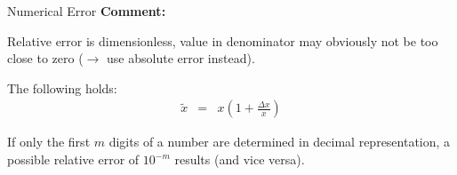 \begin{vbframe}{Numerical Error}
\textbf{Comment:}

Relative error is dimensionless, value in denominator
may obviously not be too close to zero ($\to$ use absolute error instead).


\framebreak

The following holds:
\begin{eqnarray*}
  \label{eq:1}
  \tilde x &=& x \left(1+\frac{\Delta x}{x}\right)
\end{eqnarray*}

If only the first $m$ digits of a number are determined in decimal representation,
a possible relative error of $10^{-m}$ results (and vice versa).

\framebreak









\end{vbframe}

